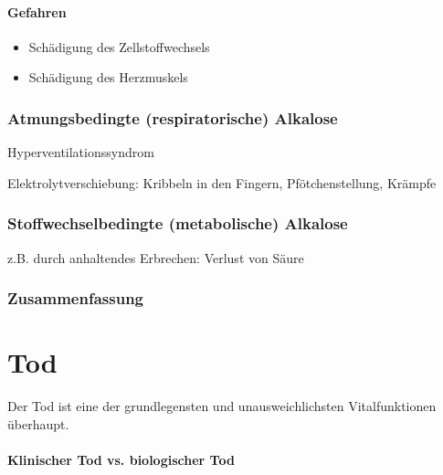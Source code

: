 \paragraph{Gefahren}

\begin{itemize}
    \item Schädigung des Zellstoffwechsels
    \item Schädigung des Herzmuskels
\end{itemize}

\subsubsection{Atmungsbedingte (respiratorische) Alkalose}
\label{topic:alkalose-respiratorische}Hyperventilationssyndrom

Elektrolytverschiebung: Kribbeln in den Fingern, Pfötchenstellung,
Krämpfe

\subsubsection{Stoffwechselbedingte (metabolische) Alkalose}
\label{topic:alkalose-metabolische}

z.B. durch anhaltendes Erbrechen: Verlust von Säure

\subsubsection*{Zusammenfassung}








\clearpage
\section{Tod}

Der Tod ist eine der grundlegensten und unausweichlichsten
Vitalfunktionen überhaupt.  



\paragraph{Klinischer Tod vs. biologischer Tod}

